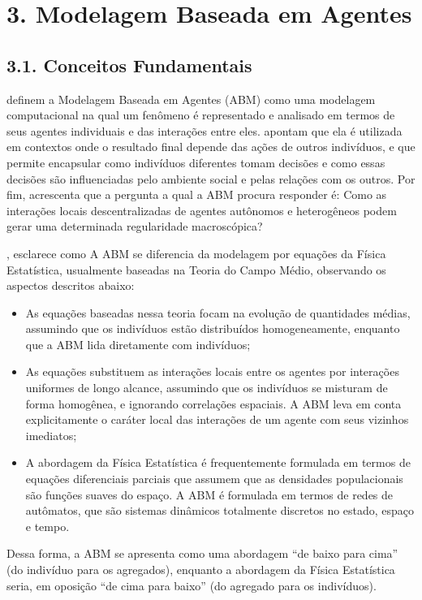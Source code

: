 \documentclass[12pt,oneside,a4paper,brazil,sumario=tradicional]{abntex2}
\begin{document}
\section*{3. Modelagem Baseada em Agentes}
\subsection*{3.1. Conceitos Fundamentais}
 definem a Modelagem Baseada em Agentes (ABM) como uma modelagem computacional na qual um fenômeno é representado e analisado em termos de seus agentes individuais e das interações entre eles.  apontam que ela é utilizada em contextos onde o resultado final depende das ações de outros indivíduos, e que permite encapsular como indivíduos diferentes tomam decisões e como essas decisões são influenciadas pelo ambiente social e pelas relações com os outros. Por fim,  acrescenta que a pergunta a qual a ABM procura responder é: Como as interações locais descentralizadas de agentes autônomos e heterogêneos podem gerar uma determinada regularidade macroscópica?

, esclarece como A ABM se diferencia da modelagem por equações da Física Estatística, usualmente baseadas na Teoria do Campo Médio, observando os aspectos descritos abaixo:

\begin{itemize}
  \item As equações baseadas nessa teoria focam na evolução de quantidades médias, assumindo que os indivíduos estão distribuídos homogeneamente, enquanto que a ABM lida diretamente com indivíduos;
  \item As equações substituem as interações locais entre os agentes por interações uniformes de longo alcance, assumindo que os indivíduos se misturam de forma homogênea, e ignorando correlações espaciais. A ABM leva em conta explicitamente o caráter local das interações de um agente com seus vizinhos imediatos;
  \item A abordagem da Física Estatística é frequentemente formulada em termos de equações diferenciais parciais que assumem que as densidades populacionais são funções suaves do espaço. A ABM é formulada em termos de redes de autômatos, que são sistemas dinâmicos totalmente discretos no estado, espaço e tempo.
\end{itemize}
Dessa forma, a ABM se apresenta como uma abordagem “de baixo para cima” (do indivíduo para os agregados), enquanto a abordagem da Física Estatística seria, em oposição “de cima para baixo” (do agregado para os indivíduos).
\end{document}
